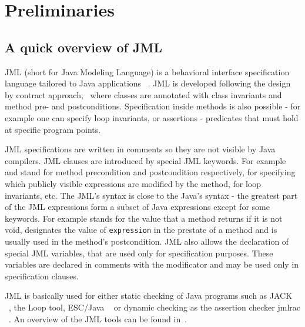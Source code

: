 \section{Preliminaries} \label{prelim}
\subsection{A quick overview of JML}
JML (short for Java Modeling Language) is a behavioral interface specification language tailored to Java applications ~\cite{JMLRefMan}. JML is developed 
following the design by contract approach,~\cite{M97oos} where classes are annotated with class invariants and method pre- and postconditions. Specification
inside methods is also possible - for example one can specify loop invariants, or assertions - predicates that must hold at specific program points. 

JML specifications are written in comments so they are not visible by Java compilers. JML clauses are introduced by 
special JML keywords. For example  and  stand for method precondition and postcondition respectively,  for specifying which publicly visible expressions are modified by the method,  for loop invariants, etc. The JML's syntax is close to the Java's syntax - the greatest part of the JML expressions form a subset of Java expressions except for some keywords. For example  stands for the value that a method returns if it is not void,  designates the value of \texttt{expression} in the prestate of a method and is usually used in the method's postcondition. JML also allows the declaration of special JML variables, that are used only for specification purposes. 
These variables are declared in comments with the  modificator and may be used only in specification clauses. 

JML is basically used for either static checking of Java programs such as JACK ~\cite{BR02jack}, the Loop tool, ESC/Java ~\cite{escjava} or dynamic checking as the assertion checker jmlrac ~\cite{jmlrac}. An overview of the JML tools can be found in~\cite{BurdyCCEKLLP03}.
     

